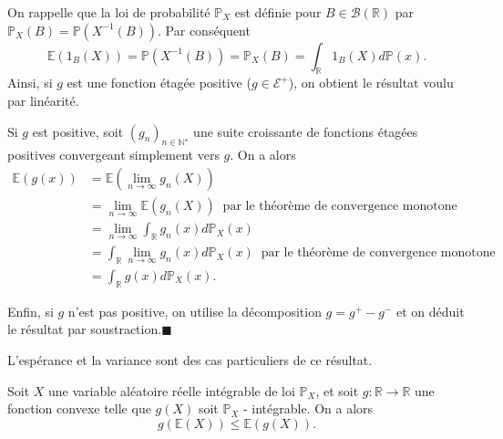 \begin{preuve}
On rappelle que la loi de probabilité \(\mathbb{P}_X\) est définie pour
\(B\in \mathcal{B}(\mathbb{R})\) par
\(\mathbb{P}_X(B)= \mathbb{P}(X^{-1}(B))\). Par conséquent
\[\mathbb{E}(1_B(X)) = \mathbb{P}(X^{-1}(B)) = \mathbb{P}_X(B) = \int_\mathbb{R}1_B (X) d\mathbb{P}(x).\]
Ainsi, si \(g\) est une fonction étagée positive
(\(g \in \mathcal{E}^+\)), on obtient le résultat voulu par linéarité.

Si \(g\) est positive, soit \((g_n)_{n \in \mathbb{N}^\star}\) une suite
croissante de fonctions étagées positives convergeant simplement vers
\(g\). On a alors \begin{align*}
\mathbb{E}(g(x)) & = \mathbb{E}(\lim_{n\to \infty}g_n(X))\\
           & = \lim_{n\to \infty} \mathbb{E}(g_n(X)) ~\text{ par le théorème de convergence monotone}\\
           & = \lim_{n\to \infty} \int_\mathbb{R}g_n(x) d\mathbb{P}_X(x)\\
           & = \int_\mathbb{R}\lim_{n\to \infty} g_n(x) d\mathbb{P}_X(x) ~\text{ par le théorème de convergence monotone}\\
           & = \int_\mathbb{R}g(x) d\mathbb{P}_X(x).
\end{align*}

Enfin, si \(g\) n'est pas positive, on utilise la décomposition
\(g = g^+ - g^-\) et on déduit le résultat par
soustraction.\hfill$\blacksquare$
\end{preuve}

\begin{remarque}\label{II-cas-particulier}

L'espérance et la variance sont des cas particuliers de ce résultat.
\end{remarque}

\begin{proposition}\label{II-jensen}

Soit \(X\) une variable aléatoire réelle intégrable de loi
\(\mathbb{P}_X\), et soit \(g : \mathbb{R}\to \mathbb{R}\) une fonction
convexe telle que \(g(X)\) soit \(\mathbb{P}_X\) - intégrable. On a
alors \[ g(\mathbb{E}(X)) \leq \mathbb{E}(g(X)).\]
\end{proposition}

